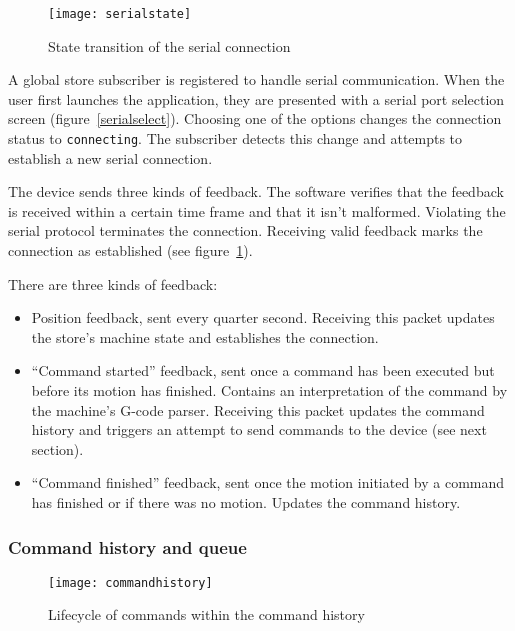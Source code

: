 \begin{figure}[ht]
    \begin{center}
        \texttt{[image: serialstate]}
        \caption{State transition of the serial connection}
        \label{serialstate}
    \end{center}
\end{figure}

A global store subscriber is registered to handle serial communication. When the
user first launches the application, they are presented with a serial port
selection screen (figure~\ref{serialselect}). Choosing one of the options
changes the connection status to \texttt{connecting}. The subscriber detects
this change and attempts to establish a new serial connection.

The device sends three kinds of feedback. The software verifies that the
feedback is received within a certain time frame and that it isn't malformed.
Violating the serial protocol terminates the connection. Receiving valid
feedback marks the connection as established (see figure~\ref{serialstate}).

There are three kinds of feedback:

\begin{itemize}
    \item Position feedback, sent every quarter second. Receiving this packet
    updates the store's machine state and establishes the connection.
    \item ``Command started'' feedback, sent once a command has been executed
    but before its motion has finished. Contains an interpretation of the
    command by the machine's G-code parser. Receiving this packet updates
    the command history and triggers an attempt to send commands to the device
    (see next section).
    \item ``Command finished'' feedback, sent once the motion initiated by a
    command has finished or if there was no motion. Updates the command history.
\end{itemize}

\subsubsection{Command history and queue}
\label{sending}

\begin{figure}[ht]
    \begin{center}
        \texttt{[image: commandhistory]}
        \caption{Lifecycle of commands within the command history}
        \label{commandhistory}
    \end{center}
\end{figure}

